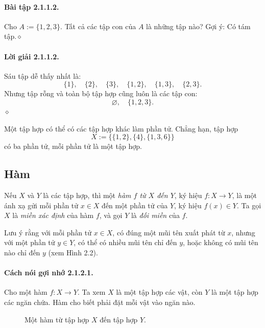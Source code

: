 \paragraph{Bài tập 2.1.1.2.} Cho $A:=\{1,2,3\}$. Tất cả các tập con của $A$ là những tập nào? Gợi ý: Có tám tập.\hfill$\diamond$
\paragraph{Lời giải 2.1.1.2.} Sáu tập dễ thấy nhất là:
\[\{1\},\quad\{2\},\quad\{3\},\quad\{1,2\},\quad\{1,3\},\quad\{2,3\}.\]
Nhưng tập rỗng và toàn bộ tập hợp cũng luôn là các tập con:
\[\varnothing,\quad\{1,2,3\}.\]\hfill$\diamond$

Một tập hợp có thể có các tập hợp khác làm phần tử. Chẳng hạn, tập hợp
\[X:=\{\{1,2\},\{4\},\{1,3,6\}\}\]
có ba phần tử, mỗi phần tử là một tập hợp.
\subsection{Hàm}
Nếu $X$ và $Y$ là các tập hợp, thì một \emph{hàm $f$ từ $X$ đến $Y$}, ký hiệu $f:X\to Y$, là một ánh xạ gửi mỗi phần tử $x\in X$ đến một phần tử của $Y$, ký hiệu $f(x)\in Y$. Ta gọi $X$ là \emph{miền xác định} của hàm $f$, và gọi $Y$ là \emph{đối miền} của $f$.

Lưu ý rằng với mỗi phần tử $x\in X$, có đúng một mũi tên xuất phát từ $x$, nhưng với một phần tử $y\in Y$, có thể có nhiều mũi tên chỉ đến $y$, hoặc không có mũi tên nào chỉ đến $y$ (xem Hình 2.2).
\paragraph{Cách nói gợi nhớ 2.1.2.1.}
Cho một hàm $f:X\to Y$. Ta xem $X$ là một tập hợp các vật, còn $Y$ là một tập hợp các ngăn chứa. Hàm cho biết phải đặt mỗi vật vào ngăn nào.
\begin{figure}[htbp]\centering
{}
\caption{Một hàm từ tập hợp $X$ đến tập hợp $Y$.}\label{fig:2-2}
\end{figure}
